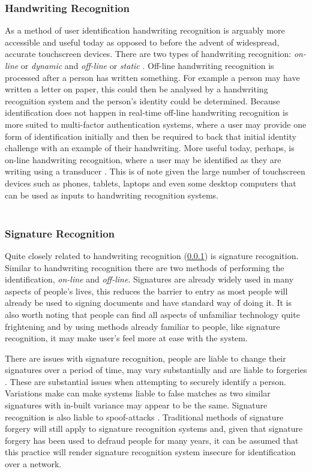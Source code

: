 \documentclass[12pt]{article}
\begin{document}
	\subsubsection{Handwriting Recognition}
	\label{subsubsect:handwriting_recognition}
	As a method of user identification handwriting recognition is arguably more accessible and useful today as opposed to before the advent of widespread, accurate touchscreen devices. There are two types of handwriting recognition: \emph{on-line} or \emph{dynamic} and \emph{off-line} or \emph{static} \citep{tappert_handwriting}. Off-line handwriting recognition is processed after a person has written something. For example a person may have written a letter on paper, this could then be analysed by a handwriting recognition system and the person's identity could be determined. Because identification does not happen in real-time off-line handwriting recognition is more suited to multi-factor authentication systems, where a user may provide one form of identification initially and then be required to back that initial identity challenge with an example of their handwriting. More useful today, perhaps, is on-line handwriting recognition, where a user may be identified as they are writing using a transducer \citep{tappert_handwriting}. This is of note given the large number of touchscreen devices such as phones, tablets, laptops and even some desktop computers that can be used as inputs to handwriting recognition systems.
	\\
	\\
	\subsubsection{Signature Recognition}
	\label{subsubsect:signature_recognition}
	Quite closely related to handwriting recognition (\ref{subsubsect:handwriting_recognition}) is signature recognition. Similar to handwriting recognition there are two methods of performing the identification, \emph{on-line} and \emph{off-line}. Signatures are already widely used in many aspects of people's lives, this reduces the barrier to entry as most people will already be used to signing documents and have standard way of doing it. It is also worth noting that people can find all aspects of unfamiliar technology quite frightening and by using methods already familiar to people, like signature recognition, it may make user's feel more at ease with the system.
	
	There are issues with signature recognition, people are liable to change their signatures over a period of time, may vary substantially and are liable to forgeries \citep{jain2004introduction}. These are substantial issues when attempting to securely identify a person. Variations make can make systems liable to false matches as two similar signatures with in-built variance may appear to be the same. Signature recognition is also liable to spoof-attacks \citep{jain2004introduction}. Traditional methods of signature forgery will still apply to signature recognition systems and, given that signature forgery has been used to defraud people for many years, it can be assumed that this practice will render signature recognition system insecure for identification over a network.
	\\
	\\
\end{document}
